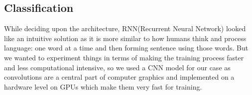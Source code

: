 \documentclass[10pt, oneside]{article}
\begin{document}
\begin{multicols}{2}







\section{Classification}

While deciding upon the architecture, RNN(Recurrent Neural Network) looked like an intuitive solution as it is more similar to how humans think and process language: one word at a time and then forming sentence using those words. But we wanted to experiment things in terms of making the training process faster and less computational intensive, so we used a CNN model for our case as convolutions are a central part of computer graphics and implemented on a hardware level on GPUs which make them very fast for training.


\end{multicols}
\end{document}
